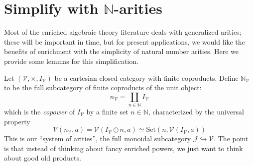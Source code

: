 \documentclass[a4paper,UKenglish]{article}
\theoremstyle{definition}
\newcommand{\Set}{\mathrm{Set}}
\newcommand{\NN}{\mathbb{N}}
\newcommand{\V}{\mathscr{V}}
\newcommand{\J}{\mathscr{J}}
\begin{document}
%

\newpage

\section{Simplify with $\NN$-arities}

Most of the enriched algebraic theory literature deals with generalized arities; these will be important in time, but for present applications, we would like the benefits of enrichment with the simplicity of natural number arities. Here we provide some lemmas for this simplification.

Let $(\V,\times,I_\V)$ be a cartesian closed category with finite coproducts. Define $\NN_\V$ to be the full subcategory of finite coproducts of the unit object: $$n_\V = \coprod_{n \in \NN} I_\V$$ which is the \textit{copower} of $I_\V$ by a finite set $n \in \NN$, characterized by the universal property $$\V(n_\V,a) = \V(I_\V \odot n,a) \simeq \Set(n,\V(I_\V,a))$$ This is our ``system of arities'', the full monoidal subcategory $\J \hookrightarrow \V$. The point is that instead of thinking about fancy enriched powers, we just want to think about good old products.
\end{document}
